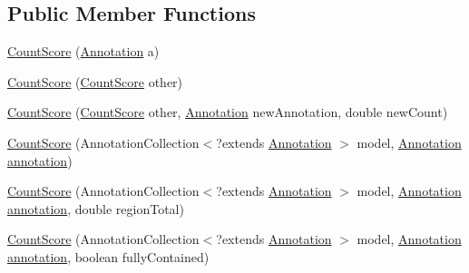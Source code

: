 \subsection*{Public Member Functions}
\begin{DoxyCompactItemize}
\item 
\hyperlink{classumms_1_1core_1_1model_1_1score_1_1_count_score_a0bf74019bebe256876b06ac7065092d9}{Count\+Score} (\hyperlink{interfaceumms_1_1core_1_1annotation_1_1_annotation}{Annotation} a)
\item 
\hyperlink{classumms_1_1core_1_1model_1_1score_1_1_count_score_af1eb5cc9d6cf02731d8bf3f06ff15551}{Count\+Score} (\hyperlink{classumms_1_1core_1_1model_1_1score_1_1_count_score}{Count\+Score} other)
\item 
\hyperlink{classumms_1_1core_1_1model_1_1score_1_1_count_score_a904bc8b0d78b591db41b430a79bc43d5}{Count\+Score} (\hyperlink{classumms_1_1core_1_1model_1_1score_1_1_count_score}{Count\+Score} other, \hyperlink{interfaceumms_1_1core_1_1annotation_1_1_annotation}{Annotation} new\+Annotation, double new\+Count)
\item 
\hyperlink{classumms_1_1core_1_1model_1_1score_1_1_count_score_ac362060cb3d51ed8ac135cf3d6d0a5da}{Count\+Score} (Annotation\+Collection$<$?extends \hyperlink{interfaceumms_1_1core_1_1annotation_1_1_annotation}{Annotation} $>$ model, \hyperlink{interfaceumms_1_1core_1_1annotation_1_1_annotation}{Annotation} \hyperlink{classumms_1_1core_1_1model_1_1score_1_1_window_score_1_1_abstract_window_score_a455fb02f18f492e611113b9da0a24888}{annotation})
\item 
\hyperlink{classumms_1_1core_1_1model_1_1score_1_1_count_score_afb91f6ab8fa071468ff2670792120798}{Count\+Score} (Annotation\+Collection$<$?extends \hyperlink{interfaceumms_1_1core_1_1annotation_1_1_annotation}{Annotation} $>$ model, \hyperlink{interfaceumms_1_1core_1_1annotation_1_1_annotation}{Annotation} \hyperlink{classumms_1_1core_1_1model_1_1score_1_1_window_score_1_1_abstract_window_score_a455fb02f18f492e611113b9da0a24888}{annotation}, double region\+Total)
\item 
\hyperlink{classumms_1_1core_1_1model_1_1score_1_1_count_score_a3f66a8c1a9483b6af4d506efc824c403}{Count\+Score} (Annotation\+Collection$<$?extends \hyperlink{interfaceumms_1_1core_1_1annotation_1_1_annotation}{Annotation} $>$ model, \hyperlink{interfaceumms_1_1core_1_1annotation_1_1_annotation}{Annotation} \hyperlink{classumms_1_1core_1_1model_1_1score_1_1_window_score_1_1_abstract_window_score_a455fb02f18f492e611113b9da0a24888}{annotation}, boolean fully\+Contained)

\end{DoxyCompactItemize}
